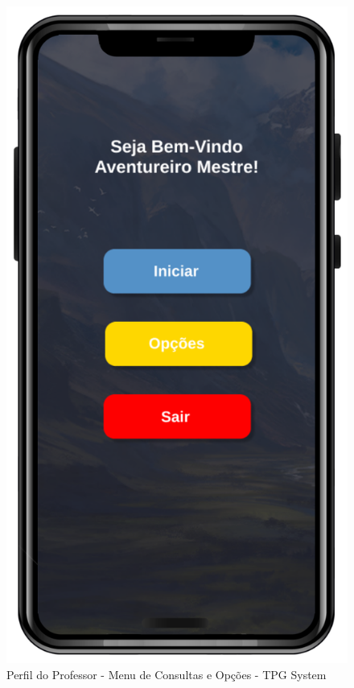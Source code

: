 \begin{figure}[!h]
\centering
\caption{Perfil do Professor - Menu de Consultas e Opções - TPG System}%
\label{fig:Tela5}
\includegraphics[scale=0.20]{Illustrations/Tela5.png}
\end{figure}


